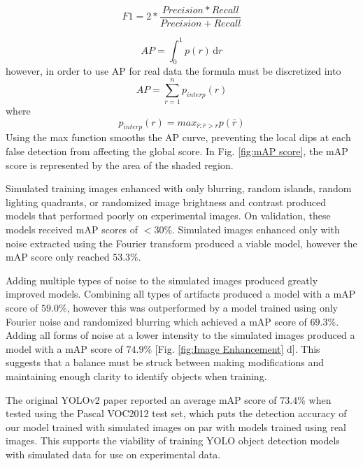 \documentclass[prl,reprint,showpacs,floatfix,nofootinbib]{revtex4-1}
\begin{document}
\begin{equation}
F1 = 2*\frac{Precision * Recall}{Precision + Recall}
\end{equation}


$$ AP = \int_0^1 \!p(r) \, \mathrm{d}r $$
however, in order to use AP for real data the formula must be discretized into
\begin{equation}
AP = \sum_{r=1}^{n} p_{interp}(r)
\end{equation}
where
$$ p_{interp}(r) = max_{\bar{r}:\bar{r}>r} p(\bar{r})  $$
Using the max function smooths the AP curve, preventing the local dips at each false detection from affecting the global score. In Fig. \ref{fig:mAP score}, the mAP score is represented by the area of the shaded region.

Simulated training images enhanced with only blurring, random islands, random lighting quadrants, or randomized image brightness and contrast produced models that performed poorly on experimental images. On validation, these models received mAP scores of $<30\%$. Simulated images enhanced only with noise extracted using the Fourier transform produced a viable model, however the mAP score only reached $53.3\%$.

Adding multiple types of noise to the simulated images produced greatly improved models. Combining all types of artifacts produced a model with a mAP score of $59.0\%$, however this was outperformed by a model trained using only Fourier noise and randomized blurring which achieved a mAP score of $69.3\%$. Adding all forms of noise at a lower intensity to the simulated images produced a model with a mAP score of $74.9\%$ [Fig. \ref{fig:Image Enhancement} d]. This suggests that a balance must be struck between making modifications and maintaining enough clarity to identify objects when training.

The original YOLOv2 \cite{redmon_yolo9000:_2016} paper reported an average mAP score of $73.4\%$ when tested using the Pascal VOC2012 test set, which puts the detection accuracy of our model trained with simulated images on par with models trained using real images. This supports the viability of training YOLO object detection models with simulated data for use on experimental data.
\end{document}
